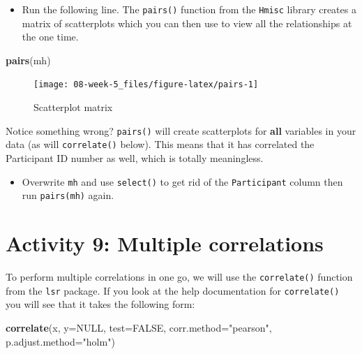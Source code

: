\documentclass[]{book}
\newenvironment{Shaded}{\begin{snugshade}}{\end{snugshade}}
\newcommand{\DataTypeTok}[1]{\textcolor[rgb]{0.13,0.29,0.53}{#1}}
\newcommand{\KeywordTok}[1]{\textcolor[rgb]{0.13,0.29,0.53}{\textbf{#1}}}
\newcommand{\NormalTok}[1]{#1}
\newcommand{\OtherTok}[1]{\textcolor[rgb]{0.56,0.35,0.01}{#1}}
\newcommand{\StringTok}[1]{\textcolor[rgb]{0.31,0.60,0.02}{#1}}
\providecommand{\tightlist}{%
  \setlength{\itemsep}{0pt}\setlength{\parskip}{0pt}}
\begin{document}
\begin{itemize}
\tightlist
\item
  Run the following line. The \texttt{pairs()} function from the \texttt{Hmisc} library creates a matrix of scatterplots which you can then use to view all the relationships at the one time.
\end{itemize}

\begin{Shaded}
\begin{Highlighting}[]
\KeywordTok{pairs}\NormalTok{(mh)}
\end{Highlighting}
\end{Shaded}

\begin{figure}

{\centering \texttt{[image: 08-week-5\_files/figure-latex/pairs-1]} 

}

\caption{Scatterplot matrix}\label{fig:pairs}
\end{figure}

Notice something wrong? \texttt{pairs()} will create scatterplots for \textbf{all} variables in your data (as will \texttt{correlate()} below). This means that it has correlated the Participant ID number as well, which is totally meaningless.

\begin{itemize}
\tightlist
\item
  Overwrite \texttt{mh} and use \texttt{select()} to get rid of the \texttt{Participant} column then run \texttt{pairs(mh)} again.
\end{itemize}

\hypertarget{activity-9-multiple-correlations}{%
\section{Activity 9: Multiple correlations}\label{activity-9-multiple-correlations}}

To perform multiple correlations in one go, we will use the \texttt{correlate()} function from the \texttt{lsr} package. If you look at the help documentation for \texttt{correlate()} you will see that it takes the following form:

\begin{Shaded}
\begin{Highlighting}[]
\KeywordTok{correlate}\NormalTok{(x, }\DataTypeTok{y=}\OtherTok{NULL}\NormalTok{, }\DataTypeTok{test=}\OtherTok{FALSE}\NormalTok{, }\DataTypeTok{corr.method=}\StringTok{"pearson"}\NormalTok{, }\DataTypeTok{p.adjust.method=}\StringTok{"holm"}\NormalTok{) }
\end{Highlighting}
\end{Shaded}
\end{document}
